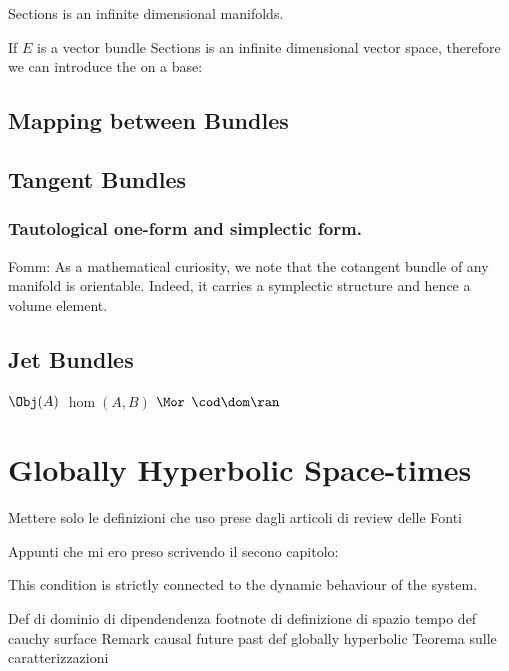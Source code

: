 \documentclass[Main]{subfiles}
\begin{document}
			\begin{observation}
				\gls{Sections} is an infinite dimensional manifolds.	
			\end{observation}
			If $E$ is a vector bundle \gls{Sections} is an infinite dimensional vector space, therefore we can introduce the  on a base:
			
		\subsection{Mapping between Bundles}
			
			
			
					
					

			
			
		\subsection{Tangent Bundles}
			\subsubsection{Tautological one-form and simplectic form.}
				Fomm: As a mathematical curiosity, we note that the cotangent bundle of any
manifold is orientable. Indeed, it carries a symplectic structure and hence a volume element.			
					
		\subsection{Jet Bundles}
			$\Obj (A)$			
			$\hom(A,B)$
			$\Mor$
			$\cod \dom \ran$
	\section{Globally Hyperbolic Space-times}
			\begin{Warning}
				Mettere solo le definizioni che uso prese dagli articoli di review delle Fonti
			\end{Warning}	
			Appunti che mi ero preso scrivendo il secono capitolo:
					
			This condition is strictly connected to the dynamic behaviour of the system.
			
			\begin{Warning}
			Def di dominio di dipendendenza
			footnote di definizione di spazio tempo
			def cauchy surface
			Remark causal future past
			def globally hyperbolic
			Teorema sulle caratterizzazioni
			\end{Warning}			
			
\end{document}
